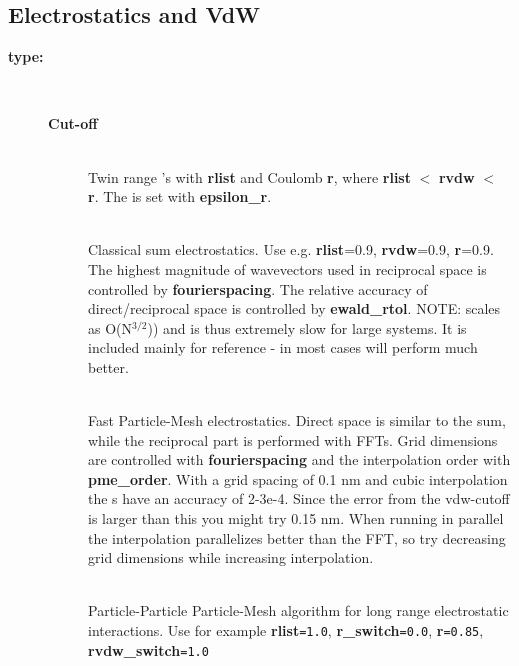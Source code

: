 \subsection{Electrostatics and VdW}
\begin{description}
\item[{\bf {}type:}]\mbox{}\\
\vspace{-2ex}\begin{description}
\item[{\bf Cut-off}]\mbox{}\\
Twin range 's with   {\bf rlist} and 
Coulomb  {\bf r},
where {\bf rlist} {\tt $<$} {\bf rvdw} {\tt $<$} {\bf r}.
The  is set with {\bf epsilon\_r}.
\item[{\bf {}}]\mbox{}\\
Classical  sum electrostatics. Use e.g. {\bf rlist}=0.9,
{\bf rvdw}=0.9, {\bf r}=0.9. The highest magnitude of
wavevectors used in reciprocal space is controlled by {\bf fourierspacing}.
The relative accuracy of direct/reciprocal space
is controlled by {\bf ewald\_rtol}. NOTE:  scales as O(N$^{3/2}$)) and
is thus extremely slow for large systems. It is included mainly for
reference - in most cases  will perform much better.
\item[{\bf {}} ]\mbox{}\\
Fast Particle-Mesh  electrostatics. Direct space is similar
to the  sum, while the reciprocal part is performed with
FFTs. Grid dimensions are controlled with {\bf fourierspacing} and the
interpolation order with {\bf pme\_order}. With a grid spacing of 0.1
nm and cubic interpolation the s have an accuracy
of 2-3e-4. Since the error from the vdw-cutoff is larger than this you
might try 0.15 nm. When running in parallel the interpolation
parallelizes better than the FFT, so try decreasing grid dimensions
while increasing interpolation.
\item[{\bf {}}]\mbox{}\\
Particle-Particle Particle-Mesh algorithm for long range
electrostatic interactions.
Use for example {\bf rlist}{\tt =1.0}, {\bf r\_switch}{\tt =0.0},
{\bf r}{\tt =0.85}, {\bf rvdw\_switch}{\tt =1.0}

\end{description}
\end{description}
